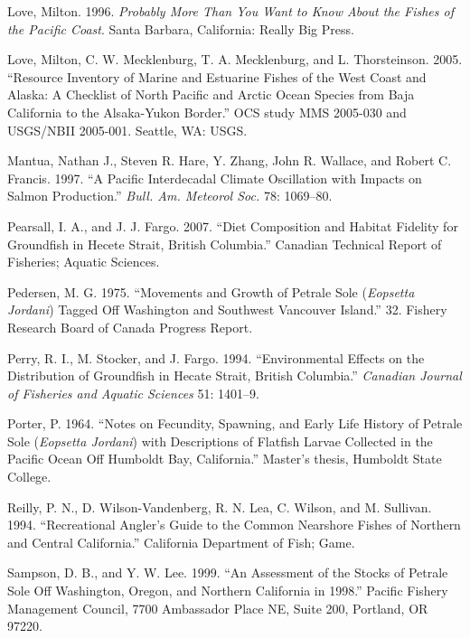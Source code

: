 \documentclass[11pt,
  english,
  letterpaper,
]{article}
\newlength{\cslhangindent}
\newenvironment{cslreferences}%
  {\setlength{\parindent}{0pt}%
  \everypar{\setlength{\hangindent}{\cslhangindent}}\ignorespaces}%
  {\par}
\begin{document}
\begin{cslreferences}
\leavevmode\hypertarget{ref-love_milton_probably_1996}{}%
Love, Milton. 1996. \emph{Probably More Than You Want to Know About the Fishes of the Pacific Coast}. Santa Barbara, California: Really Big Press.

\leavevmode\hypertarget{ref-love_milton_resource_2005}{}%
Love, Milton, C. W. Mecklenburg, T. A. Mecklenburg, and L. Thorsteinson. 2005. ``Resource Inventory of Marine and Estuarine Fishes of the West Coast and Alaska: A Checklist of North Pacific and Arctic Ocean Species from Baja California to the Alsaka-Yukon Border.'' OCS study MMS 2005-030 and USGS/NBII 2005-001. Seattle, WA: USGS.

\leavevmode\hypertarget{ref-mantua_pacific_1997}{}%
Mantua, Nathan J., Steven R. Hare, Y. Zhang, John R. Wallace, and Robert C. Francis. 1997. ``A Pacific Interdecadal Climate Oscillation with Impacts on Salmon Production.'' \emph{Bull. Am. Meteorol Soc.} 78: 1069--80.

\leavevmode\hypertarget{ref-pearsall_diet_2007}{}%
Pearsall, I. A., and J. J. Fargo. 2007. ``Diet Composition and Habitat Fidelity for Groundfish in Hecete Strait, British Columbia.'' Canadian Technical Report of Fisheries; Aquatic Sciences.

\leavevmode\hypertarget{ref-pedersen_movements_1975}{}%
Pedersen, M. G. 1975. ``Movements and Growth of Petrale Sole (\emph{Eopsetta Jordani}) Tagged Off Washington and Southwest Vancouver Island.'' 32. Fishery Research Board of Canada Progress Report.

\leavevmode\hypertarget{ref-perry_environmental_1994}{}%
Perry, R. I., M. Stocker, and J. Fargo. 1994. ``Environmental Effects on the Distribution of Groundfish in Hecate Strait, British Columbia.'' \emph{Canadian Journal of Fisheries and Aquatic Sciences} 51: 1401--9.

\leavevmode\hypertarget{ref-porter_notes_1964}{}%
Porter, P. 1964. ``Notes on Fecundity, Spawning, and Early Life History of Petrale Sole (\emph{Eopsetta Jordani}) with Descriptions of Flatfish Larvae Collected in the Pacific Ocean Off Humboldt Bay, California.'' Master's thesis, Humboldt State College.

\leavevmode\hypertarget{ref-reilly_recreational_1994}{}%
Reilly, P. N., D. Wilson-Vandenberg, R. N. Lea, C. Wilson, and M. Sullivan. 1994. ``Recreational Angler's Guide to the Common Nearshore Fishes of Northern and Central California.'' California Department of Fish; Game.

\leavevmode\hypertarget{ref-sampson_assessment_1999}{}%
Sampson, D. B., and Y. W. Lee. 1999. ``An Assessment of the Stocks of Petrale Sole Off Washington, Oregon, and Northern California in 1998.'' Pacific Fishery Management Council, 7700 Ambassador Place NE, Suite 200, Portland, OR 97220.


\end{cslreferences}
\end{document}

